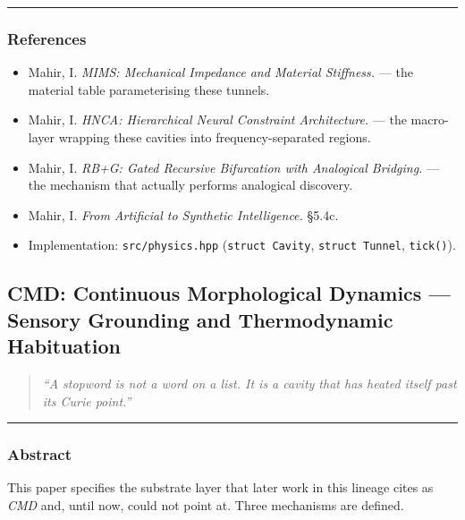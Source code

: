 \documentclass[
  11pt,
  a4paper,
]{article}
\providecommand{\tightlist}{%
  \setlength{\itemsep}{0pt}\setlength{\parskip}{0pt}}
\begin{document}
\begin{center}\rule{0.5\linewidth}{0.5pt}\end{center}

\subsubsection{References}\label{references}

\begin{itemize}
\tightlist
\item
  Mahir, I. \emph{MIMS: Mechanical Impedance and Material Stiffness.}
  --- the material table parameterising these tunnels.
\item
  Mahir, I. \emph{HNCA: Hierarchical Neural Constraint Architecture.}
  --- the macro-layer wrapping these cavities into frequency-separated
  regions.
\item
  Mahir, I. \emph{RB+G: Gated Recursive Bifurcation with Analogical
  Bridging.} --- the mechanism that actually performs analogical
  discovery.
\item
  Mahir, I. \emph{From Artificial to Synthetic Intelligence.} §5.4c.
\item
  Implementation: \texttt{src/physics.hpp} (\texttt{struct\ Cavity},
  \texttt{struct\ Tunnel}, \texttt{tick()}).
\end{itemize}

\newpage

\subsection{CMD: Continuous Morphological Dynamics --- Sensory Grounding
and Thermodynamic
Habituation}\label{cmd-continuous-morphological-dynamics-sensory-grounding-and-thermodynamic-habituation}

\begin{quote}
\emph{``A stopword is not a word on a list. It is a cavity that has
heated itself past its Curie point.''}
\end{quote}

\begin{center}\rule{0.5\linewidth}{0.5pt}\end{center}

\subsubsection{Abstract}\label{abstract-1}

This paper specifies the substrate layer that later work in this lineage
cites as \emph{CMD} and, until now, could not point at. Three mechanisms
are defined.
\end{document}
